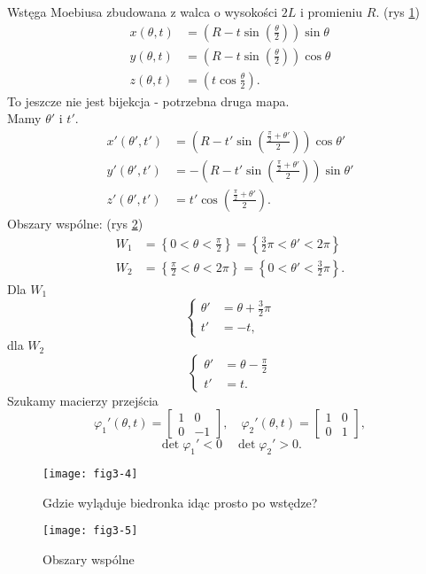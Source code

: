 \documentclass[../main.tex]{subfiles}
\begin{document}
\begin{przyklad}
    Wstęga Moebiusa zbudowana z walca o wysokości $2L$ i promieniu $R$.
    (rys \ref{fig:fig3-4})\\
    \begin{align*}
        x(\theta, t) &= \left( R - t\sin\left(\frac{\theta}{2}\right)\right)\sin\theta\\
        y(\theta, t) &= \left( R - t\sin\left(\frac{\theta}{2}\right)\right)\cos\theta\\
        z(\theta, t) &= \left( t\cos\frac{\theta}{2}\right)
    .\end{align*}
    To jeszcze nie jest bijekcja - potrzebna druga mapa.\\
    Mamy $\theta'$ i $t'$.
    \begin{align*}
        x'(\theta',t') &= \left(R - t'\sin\left(\frac{\frac{\pi}{2} + \theta'}{2}\right)\right)\cos\theta'\\
        y'(\theta',t') &= -\left(R - t'\sin\left(\frac{\frac{\pi}{2} + \theta'}{2}\right)\right)\sin\theta'\\
        z'(\theta',t') &= t' \cos\left(\frac{\frac{\pi}{2} + \theta'}{2}\right)
    .\end{align*}
    Obszary wspólne: (rys \ref{fig:fig3-5})
    \begin{align*}
        W_1 &= \left\{ 0<\theta<\frac{\pi}{2} \right\} = \left\{ \frac{3}{2}\pi < \theta' < 2\pi \right\}\\
        W_2 &= \left\{ \frac{\pi}{2} < \theta < 2\pi \right\} = \left\{ 0 < \theta' < \frac{3}{2}\pi \right\}
    .\end{align*}
    Dla $W_1$
    \[
        \begin{cases}
            \theta' &= \theta + \frac{3}{2}\pi\\
            t' &= -t
        ,\end{cases}
    \]
dla $W_2$
    \[
        \begin{cases}
            \theta' &= \theta - \frac{\pi}{2}\\
            t' &= t
        .\end{cases}
    \]
    Szukamy macierzy przejścia
    \[
        \varphi_1'(\theta, t) = \begin{bmatrix} 1&0\\0&-1 \end{bmatrix},\quad \varphi_2'(\theta,t) = \begin{bmatrix} 1&0\\0&1 \end{bmatrix}
    ,\]
\[
\det \varphi_1' < 0 \quad \det \varphi_2' > 0
.\]
\end{przyklad}
\begin{figure}[h]
    \centering
    \texttt{[image: fig3-4]}
    \caption{Gdzie wyląduje biedronka idąc prosto po wstędze?}
    \label{fig:fig3-4}
\end{figure}
\begin{figure}[h]
    \centering
    \texttt{[image: fig3-5]}
    \caption{Obszary wspólne}
    \label{fig:fig3-5}
\end{figure}
\end{document}
